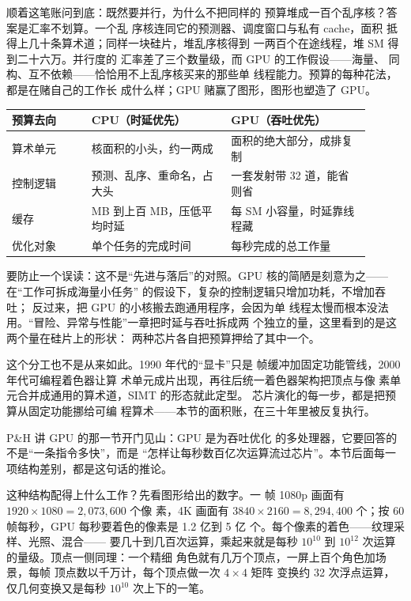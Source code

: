 顺着这笔账问到底：既然要并行，为什么不把同样的
预算堆成一百个乱序核？答案是汇率不划算。一个乱
序核连同它的预测器、调度窗口与私有 cache，面积
抵得上几十条算术道；同样一块硅片，堆乱序核得到
一两百个在途线程，堆 SM 得到二十六万。并行度的
汇率差了三个数量级，而 GPU 的工作假设——海量、
同构、互不依赖——恰恰用不上乱序核买来的那些单
线程能力。预算的每种花法，都是在赌自己的工作长
成什么样；GPU 赌赢了图形，图形也塑造了 GPU。

\begin{longtable}{L{0.2\linewidth}L{0.35\linewidth}L{0.35\linewidth}}
\toprule
预算去向 & CPU（时延优先） & GPU（吞吐优先） \\
\midrule
算术单元 & 核面积的小头，约一两成 & 面积的绝大部分，成排复制 \\\tablerowrule
控制逻辑 & 预测、乱序、重命名，占大头 & 一套发射带 32 道，能省则省 \\\tablerowrule
缓存 & MB 到上百 MB，压低平均时延 & 每 SM 小容量，时延靠线程藏 \\\tablerowrule
优化对象 & 单个任务的完成时间 & 每秒完成的总工作量 \\
\bottomrule
\end{longtable}

要防止一个误读：这不是“先进与落后”的对照。GPU
核的简陋是刻意为之——在“工作可拆成海量小任务”
的假设下，复杂的控制逻辑只增加功耗，不增加吞吐；
反过来，把 GPU 的小核搬去跑通用程序，会因为单
线程太慢而根本没法用。“冒险、异常与性能”一章把时延与吞吐拆成两
个独立的量，这里看到的是这两个量在硅片上的形状：
两种芯片各自把预算押给了其中一个。

这个分工也不是从来如此。1990 年代的“显卡”只是
帧缓冲加固定功能管线，2000 年代可编程着色器让算
术单元成片出现，再往后统一着色器架构把顶点与像
素单元合并成通用的算术道，SIMT 的形态就此定型。
芯片演化的每一步，都是把预算从固定功能挪给可编
程算术——本节的面积账，在三十年里被反复执行。

\begin{classicnote}
P\&H 讲 GPU 的那一节开门见山：GPU 是为吞吐优化
的多处理器，它要回答的不是“一条指令多快”，而是
“怎样让每秒数百亿次运算流过芯片”。本节后面每一
项结构差别，都是这句话的推论。
\end{classicnote}

这种结构配得上什么工作？先看图形给出的数字。一
帧 1080p 画面有 $1920\times1080=2,073,600$ 个像
素，4K 画面有 $3840\times2160=8,294,400$ 个；按
60 帧每秒，GPU 每秒要着色的像素是 1.2 亿到 5 亿
个。每个像素的着色——纹理采样、光照、混合——
要几十到几百次运算，乘起来就是每秒 $10^{10}$ 到
$10^{12}$ 次运算的量级。顶点一侧同理：一个精细
角色就有几万个顶点，一屏上百个角色加场景，每帧
顶点数以千万计，每个顶点做一次 $4\times4$ 矩阵
变换约 32 次浮点运算，仅几何变换又是每秒
$10^{10}$ 次上下的一笔。

